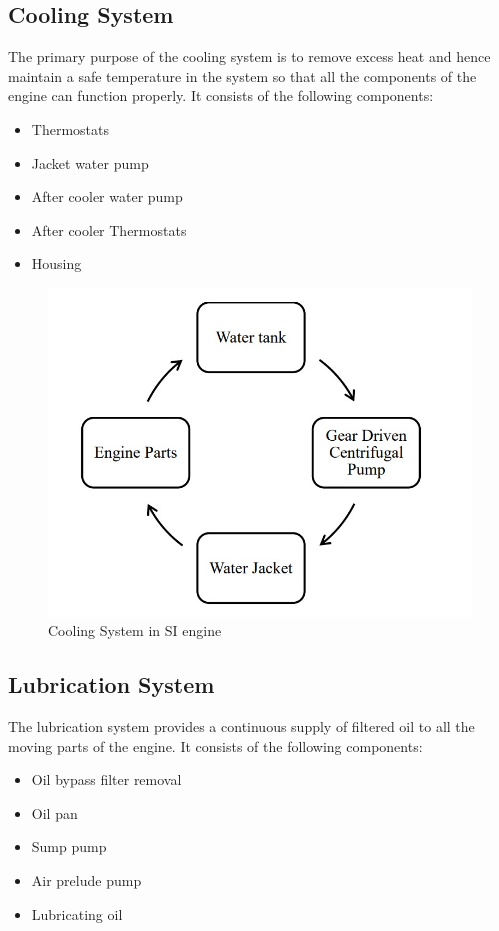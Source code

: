 \documentclass[12pt]{article}
\begin{document}
          \subsection*{Cooling System}
          The primary purpose of the cooling system is to remove excess heat and hence maintain a safe temperature in the system so that all the components of the engine can function properly. It consists of the following components:
          \begin{itemize}
            \item Thermostats
            \item Jacket water pump
            \item After cooler water pump 
            \item After cooler Thermostats
            \item Housing 
          \end{itemize}

          \begin{figure}[H]
            \begin{center}
              \includegraphics[width=0.5\linewidth]{img/ignition_si.jpeg}
              \caption{Cooling System in SI engine}
            \end{center}
          \end{figure}


          \subsection*{Lubrication System}
          The lubrication system provides a continuous supply of filtered oil to all the moving parts of the engine. It consists of the following components:
          \begin{itemize}
            \item Oil bypass filter removal 
            \item Oil pan 
            \item Sump pump 
            \item Air prelude pump 
            \item Lubricating oil
          \end{itemize}
\end{document}
